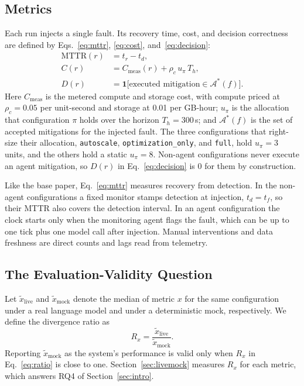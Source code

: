 \subsection{Metrics}
Each run injects a single fault. Its recovery time, cost, and decision correctness are defined by
Eqs.~\eqref{eq:mttr}, \eqref{eq:cost}, and~\eqref{eq:decision}:
\begin{align}
  \mathrm{MTTR}(r) &= t_r - t_d, \label{eq:mttr}\\
  C(r) &= C_{\mathrm{meas}}(r) + \rho_c\, u_\pi\, T_h, \label{eq:cost}\\
  D(r) &= \mathbf{1}\bigl[\text{executed mitigation} \in \mathcal{A}^{*}(f)\bigr]. \label{eq:decision}
\end{align}
Here $C_{\mathrm{meas}}$ is the metered compute and storage cost, with compute priced at
$\rho_c = 0.05$ per unit-second and storage at 0.01 per GB-hour; $u_\pi$ is the allocation that
configuration $\pi$ holds over the horizon $T_h = 300$\,s; and $\mathcal{A}^{*}(f)$ is the set of
accepted mitigations for the injected fault. The three configurations that right-size their
allocation, \texttt{autoscale}, \texttt{optimization\_only}, and \texttt{full}, hold $u_\pi = 3$
units, and the others hold a static $u_\pi = 8$. Non-agent configurations never execute an agent
mitigation, so $D(r)$ in Eq.~\eqref{eq:decision} is $0$ for them by construction.

Like the base paper, Eq.~\eqref{eq:mttr} measures recovery from detection. In the non-agent
configurations a fixed monitor stamps detection at injection, $t_d = t_f$, so their MTTR also covers
the detection interval. In an agent configuration the clock starts only when the monitoring agent
flags the fault, which can be up to one tick plus one model call after injection. Manual
interventions and data freshness are direct counts and lags read from telemetry.

\subsection{The Evaluation-Validity Question}
Let $\tilde{x}_{\mathrm{live}}$ and $\tilde{x}_{\mathrm{mock}}$ denote the median of metric $x$ for the
same configuration under a real language model and under a deterministic mock, respectively. We
define the divergence ratio as
\begin{equation}
  R_x = \frac{\tilde{x}_{\mathrm{live}}}{\tilde{x}_{\mathrm{mock}}}.
  \label{eq:ratio}
\end{equation}
Reporting $\tilde{x}_{\mathrm{mock}}$ as the system's performance is valid only when $R_x$ in
Eq.~\eqref{eq:ratio} is close to one. Section~\ref{sec:livemock} measures $R_x$ for each metric, which
answers RQ4 of Section~\ref{sec:intro}.

